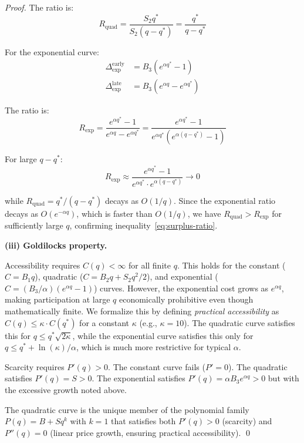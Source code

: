 \begin{proof}
The ratio is:
\begin{equation}
  R_{\text{quad}} = \frac{S_2 q^*}{S_2(q - q^*)} = \frac{q^*}{q - q^*}
\end{equation}

For the exponential curve:
\begin{align}
  \Delta_{\text{exp}}^{\text{early}} &= B_3(e^{\alpha q^*} - 1) \\
  \Delta_{\text{exp}}^{\text{late}} &= B_3(e^{\alpha q} - e^{\alpha q^*})
\end{align}

The ratio is:
\begin{equation}
  R_{\text{exp}} = \frac{e^{\alpha q^*} - 1}{e^{\alpha q} - e^{\alpha q^*}} = \frac{e^{\alpha q^*} - 1}{e^{\alpha q^*}(e^{\alpha(q - q^*)} - 1)}
\end{equation}

For large $q - q^*$:
\begin{equation}
  R_{\text{exp}} \approx \frac{e^{\alpha q^*} - 1}{e^{\alpha q^*} \cdot e^{\alpha(q - q^*)}} \to 0
\end{equation}

while $R_{\text{quad}} = q^* / (q - q^*)$ decays as $O(1/q)$. Since the
exponential ratio decays as $O(e^{-\alpha q})$, which is faster than
$O(1/q)$, we have $R_{\text{quad}} > R_{\text{exp}}$ for sufficiently large
$q$, confirming inequality~\eqref{eq:surplus-ratio}.

\textbf{(iii) Goldilocks property.}

Accessibility requires $C(q) < \infty$ for all finite $q$. This holds for the
constant ($C = B_1 q$), quadratic ($C = B_2 q + S_2 q^2 / 2$), and
exponential ($C = (B_3 / \alpha)(e^{\alpha q} - 1)$) curves. However, the
exponential cost grows as $e^{\alpha q}$, making participation at large $q$
economically prohibitive even though mathematically finite. We formalize this
by defining \emph{practical accessibility} as $C(q) \leq \kappa \cdot C(q^*)$
for a constant $\kappa$ (e.g., $\kappa = 10$). The quadratic curve satisfies
this for $q \leq q^* \sqrt{2\kappa}$, while the exponential curve satisfies
this only for $q \leq q^* + \ln(\kappa) / \alpha$, which is much more
restrictive for typical $\alpha$.

Scarcity requires $P'(q) > 0$. The constant curve fails ($P' = 0$). The
quadratic satisfies $P'(q) = S > 0$. The exponential satisfies $P'(q) =
\alpha B_3 e^{\alpha q} > 0$ but with the excessive growth noted above.

The quadratic curve is the unique member of the polynomial family $P(q) = B +
Sq^k$ with $k = 1$ that satisfies both $P'(q) > 0$ (scarcity) and
$P''(q) = 0$ (linear price growth, ensuring practical accessibility). \qed
\end{proof}

